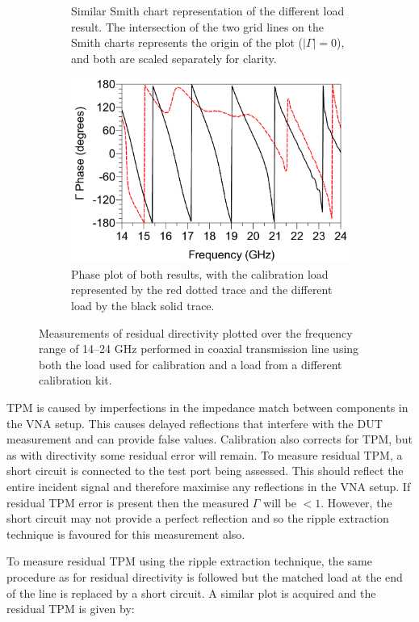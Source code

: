 \documentclass[../thesis/thesis.tex]{subfiles}
\begin{document}
\begin{refsection}
\begin{figure}
\begin{subfigure}{0.45\textwidth}
	    \caption{Similar Smith chart representation of the different load result. The intersection of the two grid lines on the Smith charts represents the origin of the plot ($|\Gamma|=0$), and both are scaled separately for clarity.}
    \end{subfigure}
	\par\bigskip
	\begin{subfigure}{0.6\textwidth}
	    \centering
		\includegraphics[width=\linewidth]{dir-c.png}
		\caption{Phase plot of both results, with the calibration load represented by the red dotted trace and the different load by the black solid trace.}
	\end{subfigure}
	\caption{Measurements of residual directivity plotted over the frequency range of 14--24 GHz performed in coaxial transmission line using both the load used for calibration and a load from a different calibration kit.}
	\label{ch4_fig_dir}
\end{figure}

TPM is caused by imperfections in the impedance match between components in the VNA setup. This causes delayed reflections that interfere with the DUT measurement and can provide false values. Calibration also corrects for TPM, but as with directivity some residual error will remain. To measure residual TPM, a short circuit is connected to the test port being assessed. This should reflect the entire incident signal and therefore maximise any reflections in the VNA setup. If residual TPM error is present then the measured $\Gamma$ will be $<1$. However, the short circuit may not provide a perfect reflection and so the ripple extraction technique is favoured for this measurement also.

To measure residual TPM using the ripple extraction technique, the same procedure as for residual directivity is followed but the matched load at the end of the line is replaced by a short circuit. A similar plot is acquired and the residual TPM is given by:


\end{refsection}
\end{document}
